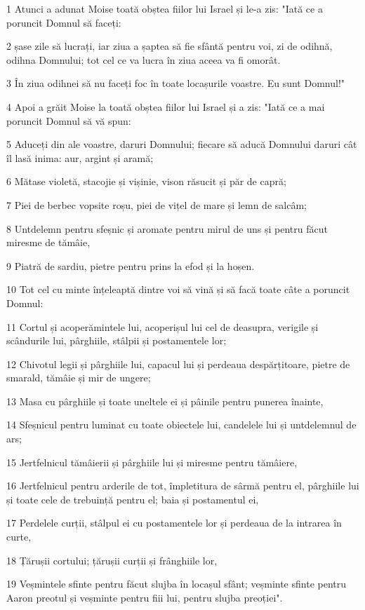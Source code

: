 \par 1 Atunci a adunat Moise toată obștea fiilor lui Israel și le-a zis: "Iată ce a poruncit Domnul să faceți:
\par 2 șase zile să lucrați, iar ziua a șaptea să fie sfântă pentru voi, zi de odihnă, odihna Domnului; tot cel ce va lucra în ziua aceea va fi omorât.
\par 3 În ziua odihnei să nu faceți foc în toate locașurile voastre. Eu sunt Domnul!"
\par 4 Apoi a grăit Moise la toată obștea fiilor lui Israel și a zis: "Iată ce a mai poruncit Domnul să vă spun:
\par 5 Aduceți din ale voastre, daruri Domnului; fiecare să aducă Domnului daruri cât îl lasă inima: aur, argint și aramă;
\par 6 Mătase violetă, stacojie și vișinie, vison răsucit și păr de capră;
\par 7 Piei de berbec vopsite roșu, piei de vițel de mare și lemn de salcâm;
\par 8 Untdelemn pentru sfeșnic și aromate pentru mirul de uns și pentru făcut miresme de tămâie,
\par 9 Piatră de sardiu, pietre pentru prins la efod și la hoșen.
\par 10 Tot cel cu minte înțeleaptă dintre voi să vină și să facă toate câte a poruncit Domnul:
\par 11 Cortul și acoperămintele lui, acoperișul lui cel de deasupra, verigile și scândurile lui, pârghiile, stâlpii și postamentele lor;
\par 12 Chivotul legii și pârghiile lui, capacul lui și perdeaua despărțitoare, pietre de smarald, tămâie și mir de ungere;
\par 13 Masa cu pârghiile și toate uneltele ei și pâinile pentru punerea înainte,
\par 14 Sfeșnicul pentru luminat cu toate obiectele lui, candelele lui și untdelemnul de ars;
\par 15 Jertfelnicul tămâierii și pârghiile lui și miresme pentru tămâiere,
\par 16 Jertfelnicul pentru arderile de tot, împletitura de sârmă pentru el, pârghiile lui și toate cele de trebuință pentru el; baia și postamentul ei,
\par 17 Perdelele curții, stâlpul ei cu postamentele lor și perdeaua de la intrarea în curte,
\par 18 Țărușii cortului; țărușii curții și frânghiile lor,
\par 19 Veșmintele sfinte pentru făcut slujba în locașul sfânt; veșminte sfinte pentru Aaron preotul și veșminte pentru fiii lui, pentru slujba preoției".
